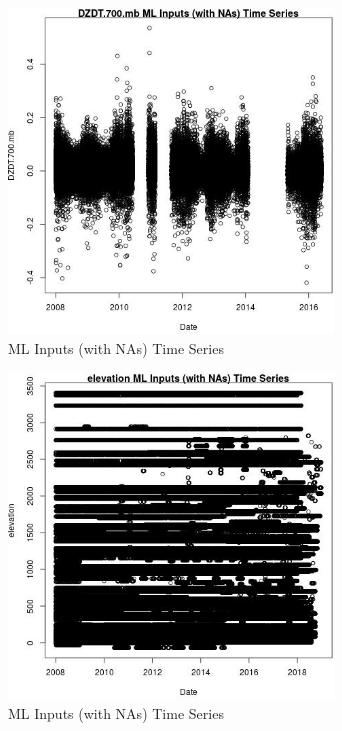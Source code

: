 \begin{figure} 
\centering  
\includegraphics[width=0.77\textwidth]{Code_Outputs/Report_ML_input_PM25_Step4_part_e_de_duplicated_aveswNAs_DZDT700mbvDate.jpg} 
\caption{\label{fig:Report_ML_input_PM25_Step4_part_e_de_duplicated_aveswNAsDZDT700mbvDate}ML Inputs (with NAs) Time Series} 
\end{figure} 
 

\begin{figure} 
\centering  
\includegraphics[width=0.77\textwidth]{Code_Outputs/Report_ML_input_PM25_Step4_part_e_de_duplicated_aveswNAs_elevationvDate.jpg} 
\caption{\label{fig:Report_ML_input_PM25_Step4_part_e_de_duplicated_aveswNAselevationvDate}ML Inputs (with NAs) Time Series} 
\end{figure} 
 

